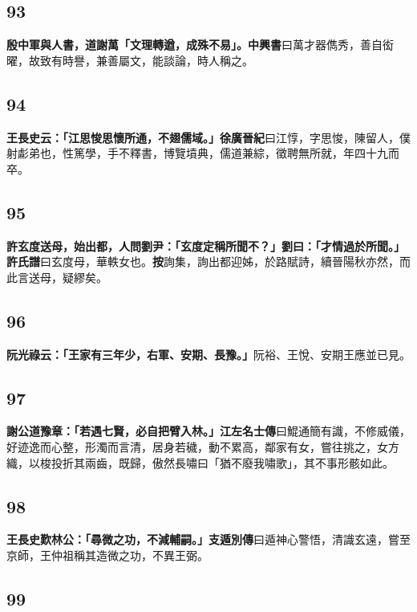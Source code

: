 \subsection*{93}

\textbf{殷中軍與人書，道謝萬「文理轉遒，成殊不易」。}{\footnotesize \textbf{中興書}曰萬才器儁秀，善自衒曜，故致有時譽，兼善屬文，能談論，時人稱之。}

\subsection*{94}

\textbf{王長史云：「江思悛思懷所通，不翅儒域。」}{\footnotesize \textbf{徐廣晉紀}曰江惇，字思悛，陳留人，僕射虨弟也，性篤學，手不釋書，博覽墳典，儒道兼綜，徵聘無所就，年四十九而卒。}

\subsection*{95}

\textbf{許玄度送母，始出都，人問劉尹：「玄度定稱所聞不？」劉曰：「才情過於所聞。」}{\footnotesize \textbf{許氏譜}曰玄度母，華軼女也。\textbf{按}詢集，詢出都迎姊，於路賦詩，續晉陽秋亦然，而此言送母，疑繆矣。}

\subsection*{96}

\textbf{阮光祿云：「王家有三年少，右軍、安期、長豫。」}{\footnotesize 阮裕、王悅、安期王應並已見。}

\subsection*{97}

\textbf{謝公道豫章：「若遇七賢，必自把臂入林。」}{\footnotesize \textbf{江左名士傳}曰鯤通簡有識，不修威儀，好迹逸而心整，形濁而言清，居身若穢，動不累高，鄰家有女，嘗往挑之，女方織，以梭投折其兩齒，既歸，傲然長嘯曰「猶不廢我嘯歌」，其不事形骸如此。}

\subsection*{98}

\textbf{王長史歎林公：「尋微之功，不減輔嗣。」}{\footnotesize \textbf{支遁別傳}曰遁神心警悟，清識玄遠，嘗至京師，王仲祖稱其造微之功，不異王弼。}

\subsection*{99}

